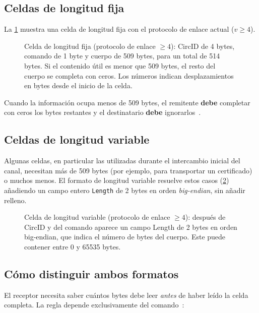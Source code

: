 \subsection{Celdas de longitud fija}

La \cref{fig:cella-fissa} muestra una celda de longitud fija con el protocolo de enlace actual ($v\ge4$).

\begin{figure}[htbp]
\centering

\caption{Celda de longitud fija (protocolo de enlace $\ge 4$): CircID de 4 bytes, comando de 1 byte y cuerpo de 509 bytes, para un total de 514 bytes. Si el contenido útil es menor que 509 bytes, el resto del cuerpo se completa con ceros. Los números indican desplazamientos en bytes desde el inicio de la celda.}
\label{fig:cella-fissa}
\end{figure}

Cuando la información ocupa menos de 509 bytes, el remitente \textbf{debe} completar con ceros los bytes restantes y el destinatario \textbf{debe} ignorarlos~.

\subsection{Celdas de longitud variable}

Algunas celdas, en particular las utilizadas durante el intercambio inicial del canal, necesitan más de 509 bytes (por ejemplo, para transportar un certificado) o muchos menos. El formato de longitud variable resuelve estos casos (\cref{fig:cella-variabile}) añadiendo un campo entero \texttt{Length} de 2 bytes en orden \emph{big-endian}, sin añadir relleno.

\begin{figure}[htbp]
\centering

\caption{Celda de longitud variable (protocolo de enlace $\ge 4$): después de CircID y del comando aparece un campo Length de 2 bytes en orden big-endian, que indica el número de bytes del cuerpo. Este puede contener entre 0 y \num{65535} bytes.}
\label{fig:cella-variabile}
\end{figure}

\subsection{Cómo distinguir ambos formatos}

El receptor necesita saber cuántos bytes debe leer \emph{antes} de haber leído la celda completa. La regla depende exclusivamente del comando~:

